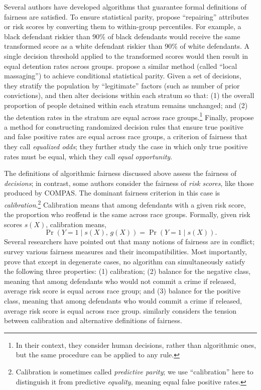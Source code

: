 \documentclass[sigconf]{acmart}
\begin{document}
Several authors have developed algorithms that guarantee formal definitions of fairness are satisfied. To ensure statistical parity,
\citet{feldman2015} propose ``repairing''
attributes or risk scores by converting them to within-group percentiles.
For example, a black defendant riskier than 90\% of black defendants would receive the same transformed score as a white defendant riskier than 90\% of white defendants.
A single decision threshold applied to the transformed scores would then result in equal detention rates across groups.
\citet{kamiran2013} propose a similar method (called ``local massaging'') to achieve conditional statistical parity. 
Given a set of decisions, they 
stratify the population by ``legitimate'' factors (such as number of prior convictions), and then alter decisions within each stratum so that:
(1) the overall proportion of people detained within each stratum remains unchanged;
and (2) the detention rates in the stratum are equal across race groups.\footnote{In their context, they consider human decisions, rather than algorithmic ones, but the same procedure can be applied to any rule.}
Finally, \citet{hardt2016} propose a method for constructing
randomized decision rules that ensure true positive and false positive rates
are equal across race groups, a criterion of fairness that they call \emph{equalized odds}; they further study the case in which only true positive rates must be equal, which they call \emph{equal opportunity}. 

The definitions of algorithmic fairness
discussed above assess the
fairness of \emph{decisions}; in contrast, 
some authors consider the fairness of \emph{risk scores}, 
like those produced by COMPAS.
The dominant fairness criterion in this case is \emph{calibration}.\footnote{Calibration is sometimes called \emph{predictive parity}; we use ``calibration'' here to distinguish it from predictive \emph{equality}, meaning equal false positive rates.}
Calibration means that among defendants with a given risk score,
the proportion who reoffend is the same across race groups.
Formally, given risk scores $s(X)$, calibration means,
\begin{equation}
\label{eq:calibration}
\Pr(Y = 1 \mid s(X), \, g(X)) = \Pr(Y = 1 \mid s(X)).
\end{equation}
Several researchers have pointed out that many notions of fairness are in conflict; \citet{berk2017} survey various fairness measures and their incompatibilities.
Most importantly, \citet{kleinberg2016inherent} prove that except in degenerate cases,
no algorithm can simultaneously satisfy the following three properties: 
(1) calibration;
(2) balance for the negative class, meaning that among defendants who would not commit a crime if released, average risk score is equal across race group;
and (3) balance for the positive class, meaning that among defendants who would commit a crime if released, average risk score is equal across race group.
\citet{chouldechova2016fair} similarly considers the tension between calibration and alternative definitions of fairness.
\end{document}
